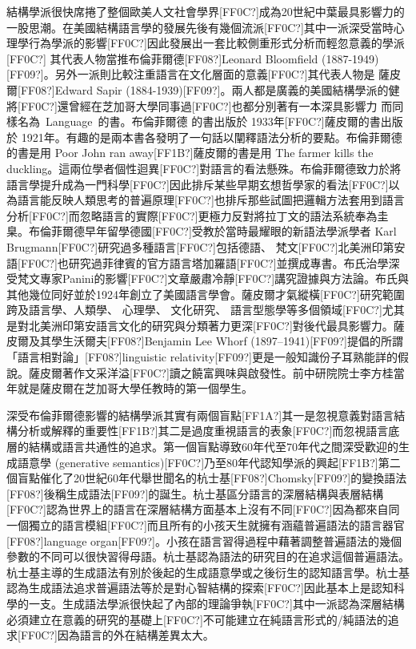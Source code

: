 結構學派很快席捲了整個歐美人文社會學界[FF0C?]成為20世紀中葉最具影響力的一股思潮。在美國結構語言學的發展先後有幾個流派[FF0C?]其中一派深受當時心理學行為學派的影響[FF0C?]因此發展出一套比較側重形式分析而輕忽意義的學派[FF0C?] 其代表人物當推布倫菲爾德[FF08?]Leonard Bloomfield (1887-1949)[FF09?]。另外一派則比較注重語言在文化層面的意義[FF0C?]其代表人物是 薩皮爾[FF08?]Edward Sapir (1884-1939)[FF09?]。兩人都是廣義的美國結構學派的健將[FF0C?]還曾經在芝加哥大學同事過[FF0C?]也都分別著有一本深具影響力 而同樣名為~Language~的書。布倫菲爾德 的書出版於 1933年[FF0C?]薩皮爾的書出版於 1921年。有趣的是兩本書各發明了一句話以闡釋語法分析的要點。布倫菲爾德的書是用  Poor John ran away[FF1B?]薩皮爾的書是用 The farmer kills the duckling。這兩位學者個性迴異[FF0C?]對語言的看法懸殊。布倫菲爾德致力於將語言學提升成為一門科學[FF0C?]因此排斥某些早期玄想哲學家的看法[FF0C?]以為語言能反映人類思考的普遍原理[FF0C?]也排斥那些試圖把邏輯方法套用到語言分析[FF0C?]而忽略語言的實際[FF0C?]更極力反對將拉丁文的語法系統奉為圭臬。布倫菲爾德早年留學德國[FF0C?]受教於當時最耀眼的新語法學派學者 Karl Brugmann[FF0C?]研究過多種語言[FF0C?]包括德語、 梵文[FF0C?]北美洲印第安語[FF0C?]也研究過菲律賓的官方語言塔加羅語[FF0C?]並撰成專書。布氏治學深受梵文專家Panini的影響[FF0C?]文章嚴肅冷靜[FF0C?]講究證據與方法論。布氏與其他幾位同好並於1924年創立了美國語言學會。薩皮爾才氣縱橫[FF0C?]研究範圍跨及語言學、人類學、 心理學、 文化研究、 語言型態學等多個領域[FF0C?]尤其是對北美洲印第安語言文化的研究與分類著力更深[FF0C?]對後代最具影響力。薩皮爾及其學生沃爾夫[FF08?]Benjamin Lee Whorf (1897–1941)[FF09?]提倡的所謂「語言相對論」[FF08?]linguistic relativity[FF09?]更是一般知識份子耳熟能詳的假說。薩皮爾著作文采洋溢[FF0C?]讀之饒富興味與啟發性。前中研院院士李方桂當年就是薩皮爾在芝加哥大學任教時的第一個學生。   

深受布倫菲爾德影響的結構學派其實有兩個盲點[FF1A?]其一是忽視意義對語言結構分析或解釋的重要性[FF1B?]其二是過度重視語言的表象[FF0C?]而忽視語言底層的結構或語言共通性的追求。第一個盲點導致60年代至70年代之間深受歡迎的生成語意學 (generative semantics)[FF0C?]乃至80年代認知學派的興起[FF1B?]第二個盲點催化了20世紀60年代舉世聞名的杭士基[FF08?]Chomsky[FF09?]的變換語法[FF08?]後稱生成語法[FF09?]的誕生。杭士基區分語言的深層結構與表層結構[FF0C?]認為世界上的語言在深層結構方面基本上沒有不同[FF0C?]因為都來自同一個獨立的語言模組[FF0C?]而且所有的小孩天生就擁有涵蘊普遍語法的語言器官[FF08?]language organ[FF09?]。小孩在語言習得過程中藉著調整普遍語法的幾個參數的不同可以很快習得母語。杭士基認為語法的研究目的在追求這個普遍語法。杭士基主導的生成語法有別於後起的生成語意學或之後衍生的認知語言學。杭士基認為生成語法追求普遍語法等於是對心智結構的探索[FF0C?]因此基本上是認知科學的一支。生成語法學派很快起了內部的理論爭執[FF0C?]其中一派認為深層結構必須建立在意義的研究的基礎上[FF0C?]不可能建立在純語言形式的/純語法的追求[FF0C?]因為語言的外在結構差異太大。


